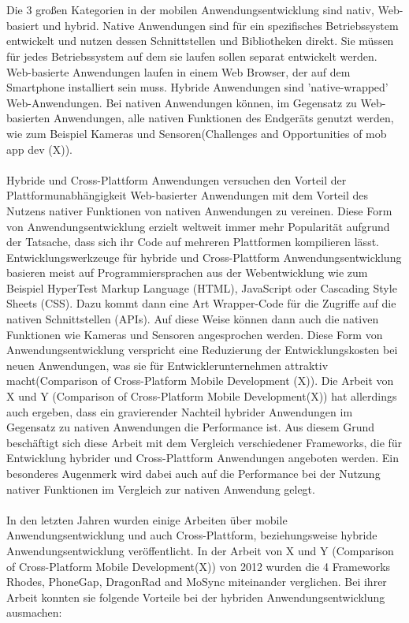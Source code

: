 \\
\\
Die 3 großen Kategorien in der mobilen Anwendungsentwicklung sind nativ, Web-basiert und hybrid. Native Anwendungen sind für ein spezifisches Betriebssystem entwickelt und nutzen dessen Schnittstellen und Bibliotheken direkt. Sie müssen für jedes Betriebssystem auf dem sie laufen sollen separat entwickelt werden. Web-basierte Anwendungen laufen in einem Web Browser, der auf dem Smartphone installiert sein muss. Hybride Anwendungen sind 'native-wrapped' Web-Anwendungen. Bei nativen Anwendungen können, im Gegensatz zu Web-basierten Anwendungen, alle nativen Funktionen des Endgeräts genutzt werden, wie zum Beispiel Kameras und Sensoren(Challenges and Opportunities of mob app dev (X)). 
\\
\\
Hybride und Cross-Plattform Anwendungen versuchen den Vorteil der Plattformunabhängigkeit Web-basierter Anwendungen mit dem Vorteil des Nutzens nativer Funktionen von nativen Anwendungen zu vereinen. Diese Form von Anwendungsentwicklung erzielt weltweit immer mehr Popularität aufgrund der Tatsache, dass sich ihr Code auf mehreren Plattformen kompilieren lässt. Entwicklungswerkzeuge für hybride und Cross-Plattform Anwendungsentwicklung basieren meist auf Programmiersprachen aus der Webentwicklung wie zum Beispiel HyperTest Markup Language (HTML), JavaScript oder Cascading Style Sheets (CSS). Dazu kommt dann eine Art Wrapper-Code für die Zugriffe auf die nativen Schnittstellen (APIs). Auf diese Weise können dann auch die nativen Funktionen wie Kameras und Sensoren angesprochen werden. Diese Form von Anwendungsentwicklung verspricht eine Reduzierung der Entwicklungskosten bei neuen Anwendungen, was sie für Entwicklerunternehmen attraktiv macht(Comparison of Cross-Platform Mobile Development (X)). Die Arbeit von X und Y (Comparison of Cross-Platform Mobile Development(X)) hat allerdings auch ergeben, dass ein gravierender Nachteil hybrider Anwendungen im Gegensatz zu nativen Anwendungen die Performance ist. Aus diesem Grund beschäftigt sich diese Arbeit mit dem Vergleich verschiedener Frameworks, die für Entwicklung hybrider und Cross-Plattform Anwendungen angeboten werden. Ein besonderes Augenmerk wird dabei auch auf die Performance bei der Nutzung nativer Funktionen im Vergleich zur nativen Anwendung gelegt.
\\
\\
In den letzten Jahren wurden einige Arbeiten über mobile Anwendungsentwicklung und auch Cross-Plattform, beziehungsweise hybride Anwendungsentwicklung veröffentlicht. In der Arbeit von X und Y (Comparison of Cross-Platform Mobile Development(X)) von 2012 wurden die 4 Frameworks Rhodes, PhoneGap, DragonRad and MoSync miteinander verglichen. Bei ihrer Arbeit konnten sie folgende Vorteile bei der hybriden Anwendungsentwicklung ausmachen: 

